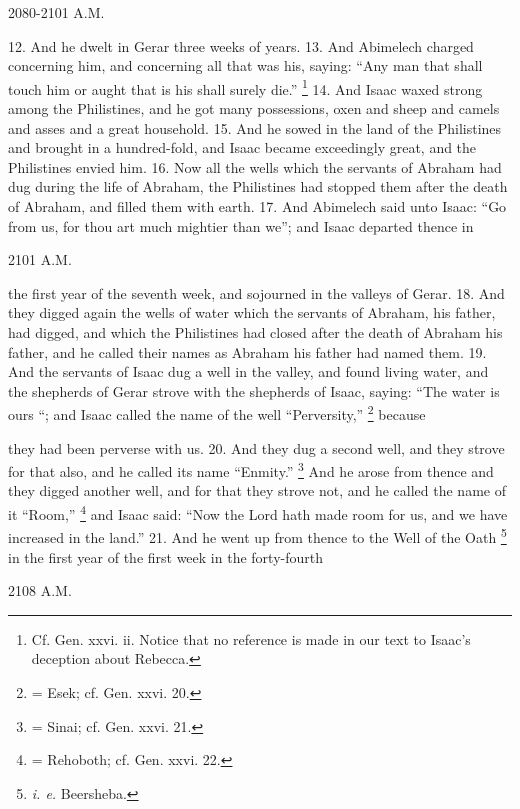 2080-2101 A.M.

12. And he dwelt in Gerar three weeks of years. 13. And Abimelech charged concerning him, and concerning all that was his, saying: ``Any man that shall touch him or aught that is his shall surely die.'' \footnote{Cf. Gen. xxvi. ii. Notice that no reference is made in our text to Isaac's deception about Rebecca.} 14. And Isaac waxed strong among the Philistines, and he got many possessions, oxen and sheep and camels and asses and a great household. 15. And he sowed in the land of the Philistines and brought in a hundred-fold, and Isaac became exceedingly great, and the Philistines envied him. 16. Now all the wells which the servants of Abraham had dug during the life of Abraham, the Philistines had stopped them after the death of Abraham, and filled them with earth. 17. And Abimelech said unto Isaac: ``Go from us, for thou art much mightier than we''; and Isaac departed thence in

2101 A.M.

the first year of the seventh week, and sojourned in the valleys of Gerar. 18. And they digged again the wells of water which the servants of Abraham, his father, had digged, and which the Philistines had closed after the death of Abraham his father, and he called their names as Abraham his father had named them. 19. And the servants of Isaac dug a well in the valley, and found living water, and the shepherds of Gerar strove with the shepherds of Isaac, saying: ``The water is ours ``; and Isaac called the name of the well ``Perversity,'' \footnote{= Esek; cf. Gen. xxvi. 20.} because

they had been perverse with us. 20. And they dug a second well, and they strove for that also, and he called its name ``Enmity.'' \footnote{= Sinai; cf. Gen. xxvi. 21.} And he arose from thence and they digged another well, and for that they strove not, and he called the name of it ``Room,'' \footnote{= Rehoboth; cf. Gen. xxvi. 22.} and Isaac said: ``Now the Lord hath made room for us, and we have increased in the land.'' 21. And he went up from thence to the Well of the Oath \footnote{\emph{i. e.} Beersheba.} in the first year of the first week in the forty-fourth

2108 A.M.

